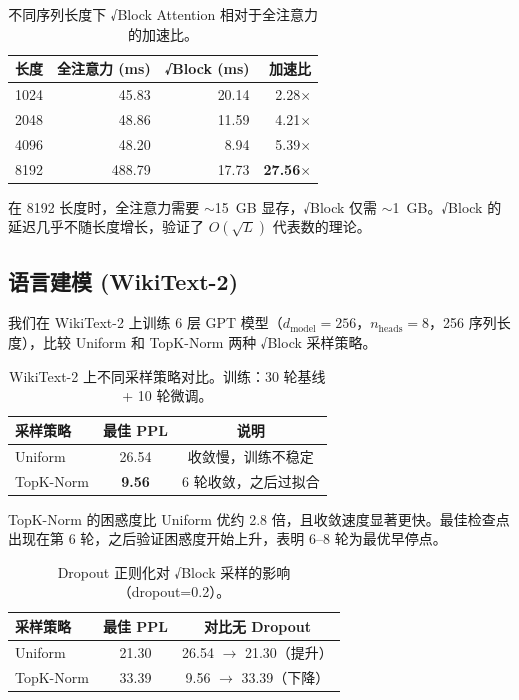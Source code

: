 \documentclass[11pt,a4paper,fontset=mac]{ctexart}
\begin{document}
\begin{table}[h]
\centering
\caption{不同序列长度下 √Block Attention 相对于全注意力的加速比。}
\label{tab:speedup}
\begin{tabular}{lrrr}
\toprule
长度 & 全注意力 (ms) & √Block (ms) & 加速比 \\
\midrule
1024   & 45.83 & 20.14 & 2.28$\times$ \\
2048   & 48.86 & 11.59 & 4.21$\times$ \\
4096   & 48.20 &  8.94 & 5.39$\times$ \\
8192   & 488.79& 17.73 & \textbf{27.56$\times$} \\
\bottomrule
\end{tabular}
\end{table}

在 8192 长度时，全注意力需要 $\sim$15~GB 显存，√Block 仅需 $\sim$1~GB。√Block 的延迟几乎不随长度增长，验证了 $O(\sqrt{L})$ 代表数的理论。

\subsection{语言建模 (WikiText-2)}

我们在 WikiText-2 \cite{merity2016pointer} 上训练 6 层 GPT 模型（$d_{\text{model}}=256$，$n_{\text{heads}}=8$，256 序列长度），比较 Uniform 和 TopK-Norm 两种 √Block 采样策略。

\begin{table}[h]
\centering
\caption{WikiText-2 上不同采样策略对比。训练：30 轮基线 + 10 轮微调。}
\label{tab:lm}
\begin{tabular}{lcc}
\toprule
采样策略 & 最佳 PPL & 说明 \\
\midrule
Uniform      & 26.54 & 收敛慢，训练不稳定 \\
TopK-Norm    & \textbf{9.56} & 6 轮收敛，之后过拟合 \\
\bottomrule
\end{tabular}
\end{table}

TopK-Norm 的困惑度比 Uniform 优约 2.8 倍，且收敛速度显著更快。最佳检查点出现在第 6 轮，之后验证困惑度开始上升，表明 6--8 轮为最优早停点。

\begin{table}[h]
\centering
\caption{Dropout 正则化对 √Block 采样的影响（dropout=0.2）。}
\label{tab:dropout}
\begin{tabular}{lcc}
\toprule
采样策略 & 最佳 PPL & 对比无 Dropout \\
\midrule
Uniform   & 21.30 & 26.54 $\rightarrow$ 21.30（提升） \\
TopK-Norm & 33.39 & 9.56 $\rightarrow$ 33.39（下降） \\
\bottomrule
\end{tabular}
\end{table}
\end{document}
